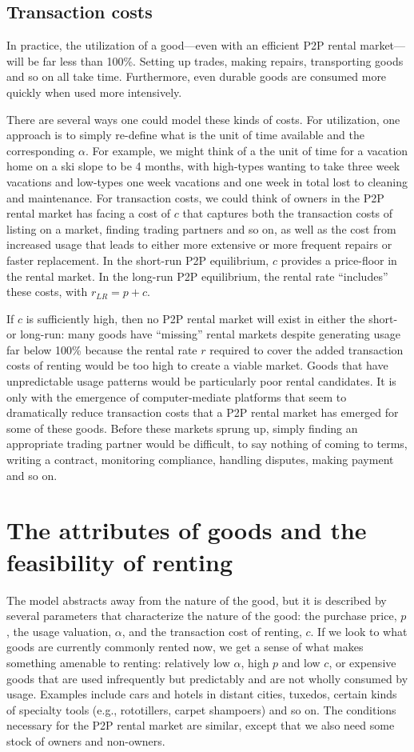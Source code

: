 \documentclass[11pt]{article}
\begin{document}
\subsection{Transaction costs}
In practice, the utilization of a good---even with an efficient P2P rental market---will be far less than 100\%.
Setting up trades, making repairs, transporting goods and so on all take time.  
Furthermore, even durable goods are consumed more quickly when used more intensively. 

There are several ways one could model these kinds of costs. 
For utilization, one approach is to simply re-define what is the unit of time available and the corresponding $\alpha$. 
For example, we might think of a the unit of time for a vacation home on a ski slope to be 4 months, with high-types wanting to take three week vacations and low-types one week vacations and one week in total lost to cleaning and maintenance.      
For transaction costs, we could think of owners in the P2P rental market has facing a cost of $c$ that captures both the transaction costs of listing on a market, finding trading partners and so on, as well as the cost from increased usage that leads to either more extensive or more frequent repairs or faster replacement.
In the short-run P2P equilibrium, $c$ provides a price-floor in the rental market.  
In the long-run P2P equilibrium, the rental rate ``includes'' these costs, with $r_{LR} = p + c$. 

If $c$ is sufficiently high, then no P2P rental market will exist in either the short- or long-run: 
many goods have ``missing'' rental markets despite generating usage far below 100\% because the rental rate $r$ required to cover the added transaction costs of renting would be too high to create a viable market.
Goods that have unpredictable usage patterns would be particularly poor rental candidates.  
It is only with the emergence of computer-mediate platforms that seem to dramatically reduce transaction costs that a P2P rental market has emerged for some of these goods. 
Before these markets sprung up, simply finding an appropriate trading partner would be difficult, to say nothing of coming to terms, writing a contract, monitoring compliance, handling disputes, making payment and so on. 

\section{The attributes of goods and the feasibility of renting} 
The model abstracts away from the nature of the good, but it is described by several parameters that characterize the nature of the good: the purchase price, $p$, the usage valuation, $\alpha$, and the transaction cost of renting, $c$.  
If we look to what goods are currently commonly rented now, we get a sense of what makes something amenable to renting: 
relatively low $\alpha$, high $p$ and low $c$, or expensive goods that are used infrequently but predictably and are not wholly consumed by usage. 
Examples include cars and hotels in distant cities, tuxedos, certain kinds of specialty tools (e.g., rototillers, carpet shampoers) and so on. 
The conditions necessary for the P2P rental market are similar, except that we also need some stock of owners and non-owners. 
\end{document}
